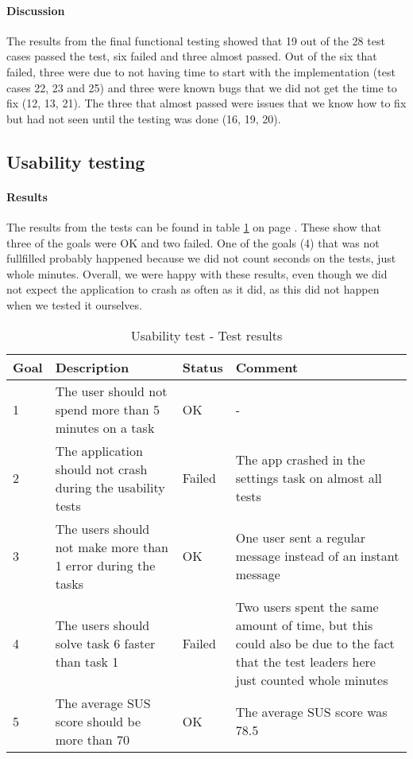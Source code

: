 \paragraph{Discussion}\hfill
\newline
The results from the final functional testing showed that 19 out of the 28 test cases passed the test,  six failed and three almost passed. Out of the six that failed, three were due to not having time to start with the implementation (test cases 22, 23 and 25) and three were known bugs that we did not get the time to fix (12, 13, 21). The three that almost passed were issues that we know how to fix but had not seen until the testing was done (16, 19, 20).

\newpage

\subsection{Usability testing}
\paragraph{Results}\hfill
\newline
The results from the tests can be found in table \ref{tab:usabilitytestresults} on page \pageref{tab:usabilitytestresults}. These show that three of the goals were OK and two failed. One of the goals (4) that was not fullfilled probably happened because we did not count seconds on the tests, just whole minutes. Overall, we were happy with these results, even though we did not expect the application to crash as often as it did, as this did not happen when we tested it ourselves.

\begin{table}[h!]
\begin{center}
\begin{tabular}{l|p{6cm}|l|p{6cm}}	\hline
\textbf{Goal}&\textbf{Description}&\textbf{Status}&\textbf{Comment}\\ \hline \hline
1&The user should not spend more than 5 minutes on a task&OK&-\\ \hline
2&The application should not crash during the usability tests&Failed&The app crashed in the settings task on almost all tests\\ \hline
3&The users should not make more than 1 error during the tasks&OK&One user sent a regular message instead of an instant message\\ \hline
4&The users should solve task 6 faster than task 1&Failed&Two users spent the same amount of time, but this could also be due to the fact that the test leaders here just counted whole minutes\\ \hline
5&The average SUS score should be more than 70&OK&The average SUS score was 78.5\\ \hline 
\end{tabular}
\end{center}
\caption{Usability test - Test results} \label{tab:usabilitytestresults}
\end{table}

